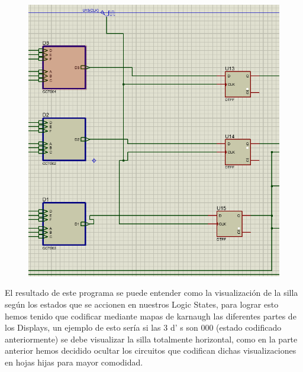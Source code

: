 \documentclass{article}
\begin{document}
\begin{figure}[!h]
    \centering
    \includegraphics[scale=0.5]{COMMENT1.PNG}
\end{figure}

\newpage
El resultado de este programa se puede entender como la visualización de la silla según los
estados que se accionen en nuestros Logic States, para lograr esto hemos tenido que
codificar mediante mapas de karnaugh las diferentes partes de los Displays, un ejemplo de
esto sería si las 3 d’ s son 000 (estado codificado anteriormente) se debe visualizar la silla
totalmente horizontal, como en la parte anterior hemos decidido ocultar los circuitos que
codifican dichas visualizaciones en hojas hijas para mayor comodidad.
\end{document}
